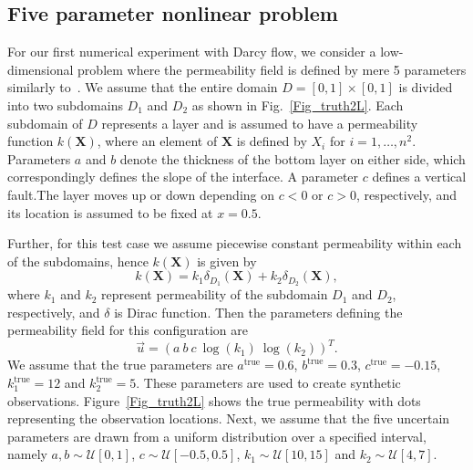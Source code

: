 \documentclass[12, a4paper]{article}
\numberwithin{equation}{section}
\begin{document}
\subsection{Five parameter nonlinear problem}

For our first numerical experiment with Darcy flow, we consider a low-dimensional problem where the permeability field is defined by mere 5 parameters similarly to~\cite{Igetal14}. We assume that the entire domain $D=[0,1] \times [0,1]$ is divided into two subdomains $D_1$ and $D_2$ as shown in Fig.~\ref{Fig_truth2L}. Each subdomain of $D$ represents a layer and is assumed to have a  permeability function $k(\textbf{X})$, where an element of $\textbf{X}$ is defined by ${X_i}$ for $i=1,\hdots,n^2$. 
Parameters $a$ and $b$ denote the thickness of the bottom layer on either side, which correspondingly defines the slope of the interface. A parameter $c$ defines a vertical fault.The layer moves up or down depending on $c<0$ or $c>0$, respectively, and its location is assumed to be fixed at $x=0.5$.

Further, for this test case we assume piecewise constant permeability within each of the subdomains, hence  $k(\textbf{X})$ is given by
\begin{equation*} 
k(\textbf{X}) =  k_1 \delta _{D_1} (\textbf{X}) + k_2 \delta _{D_2} (\textbf{X}),
\end{equation*}
where $k_1$ and $k_2$ represent permeability of the subdomain $D_1$ and $D_2$, respectively, and $\delta$ is Dirac function. Then the parameters defining the permeability field for this configuration are    
\begin{equation*}
\vec{u} =(a \ b \ c \ \log(k_1) \ \log(k_2))^T. 
\end{equation*} 
We assume that the true parameters are $a^{\textrm{true}}=0.6$, $b^{\textrm{true}}=0.3$, $c^{\textrm{true}} = -0.15$, $k_1^{\textrm{true}} = 12$ and $k_2^{\textrm{true}} = 5$. These parameters are used to create synthetic observations. Figure~\ref{Fig_truth2L} shows the true permeability with dots representing the observation locations. Next, we assume that the five uncertain parameters are drawn from a uniform distribution over a specified interval, namely $a, b\sim\mathcal{U}[0,1]$, $c \sim \mathcal{U}[-0.5,0.5]$, $k_1 \sim \mathcal{U}[10,15]$ and $k_2 \sim \mathcal{U} [4,7]$.  
\end{document}
